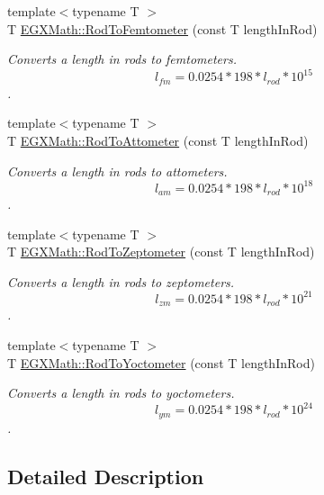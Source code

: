 \begin{DoxyCompactItemize}
{\footnotesize template$<$typename T $>$ }\\T \mbox{\hyperlink{group___e_g_x_math-_conversions-_length_conversions-_imperial-_rod-_s_i_ga93c5626ebf87e3f15901731a1e2e9cb3}{E\+G\+X\+Math\+::\+Rod\+To\+Femtometer}} (const T length\+In\+Rod)
\begin{DoxyCompactList}\small\item\em Converts a length in rods to femtometers. \[ l_{fm}=0.0254 * 198 * l_{rod} * 10^{15} \]. \end{DoxyCompactList}\item 
{\footnotesize template$<$typename T $>$ }\\T \mbox{\hyperlink{group___e_g_x_math-_conversions-_length_conversions-_imperial-_rod-_s_i_ga8ea230e8e68a945a135edff4ba01a449}{E\+G\+X\+Math\+::\+Rod\+To\+Attometer}} (const T length\+In\+Rod)
\begin{DoxyCompactList}\small\item\em Converts a length in rods to attometers. \[ l_{am}=0.0254 * 198 * l_{rod} * 10^{18} \]. \end{DoxyCompactList}\item 
{\footnotesize template$<$typename T $>$ }\\T \mbox{\hyperlink{group___e_g_x_math-_conversions-_length_conversions-_imperial-_rod-_s_i_gae5ab77b04e6ee5bfdce5aaa3917b92a5}{E\+G\+X\+Math\+::\+Rod\+To\+Zeptometer}} (const T length\+In\+Rod)
\begin{DoxyCompactList}\small\item\em Converts a length in rods to zeptometers. \[ l_{zm}=0.0254 * 198 * l_{rod} * 10^{21} \]. \end{DoxyCompactList}\item 
{\footnotesize template$<$typename T $>$ }\\T \mbox{\hyperlink{group___e_g_x_math-_conversions-_length_conversions-_imperial-_rod-_s_i_ga8ed4c9bfa230e77380ff81ff9ed59a6e}{E\+G\+X\+Math\+::\+Rod\+To\+Yoctometer}} (const T length\+In\+Rod)
\begin{DoxyCompactList}\small\item\em Converts a length in rods to yoctometers. \[ l_{ym}=0.0254 * 198 * l_{rod} * 10^{24} \]. \end{DoxyCompactList}\end{DoxyCompactItemize}


\subsection{Detailed Description}


